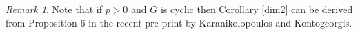 \documentclass[draft, 11pt]{article} %
\theoremstyle{plain}
\theoremstyle{remark}
\newtheorem*{rem}{Remark}
\newcommand{\ZZ}{{\mathbb Z}}
\begin{document}
\begin{rem}
  Note that if $p>0$ and $G$ is cyclic then Corollary \ref{dim2} can be derived from Proposition $6$ in the recent pre-print
 \cite{kako} by Karanikolopoulos and Kontogeorgis.
\end{rem}

\begin{comment}
We also consider an alternative approach to computing the fixed dimension of $H^0(X,\Omega_X^{\otimes m})$, relying on \citep[Thm 4.5]{galoisstruc}.
For the rest of this section we assume that $n$ is co-prime to $p$, that $g_X\geq 2$ and that $g_Y=0$.

We now introduce some notation from \cite{galoisstruc}.
We first denote by $\chi_P$ the representation of the decomposition group $G_P$ on the cotangent space $\mathfrak{m}_P/\mathfrak{m}_P^2$.
We also introduce the unique projective module $N_{G,X}$ satisfying
\begin{equation*}
 \bigoplus^n N_{G,X} = \bigoplus_{P\in X} \bigoplus_{d=1}^{e^t_p-1} \bigoplus^d {\rm Ind}_{G_P}^G(\chi_P^d),
\end{equation*}

where $e^t_p$ denotes the (tame) ramification index at a point $P\in X$, as in \citep[Thm 4.3]{galoisstruc}.

Fix an integer $m\geq 2$. Now if we write $mK_X = \sum_{P\in X} n_P[P]$ then we can define $r_P\in \{0,\ldots, e^t_p - 1\}$ and $s_P\in \ZZ$ to be the unique values such that
\[
 n_P = r_P + s_Pe_P^t.
\]

Finally, if for any $Q\in Y$ we let $\bar Q \in X$ be an element of the fibre with respect to $\pi$, we can state \citep[Thm 4.5]{galoisstruc}, which says that we have the following equality in $K_0(k[G])$:
\begin{equation}\label{eq}
 \chi(G,X,\Omega^{\otimes m}) = -[N_{G,X}] +\sum_{Q\in Y}\sum^{r_{\bar Q}}_{d=1} [{\rm Ind}_{G_{\bar Q}}^G(\chi_{\bar Q}^d)]  + \left( 1 + \sum_{Q\in Y} s_{\bar Q} \right) [k[G]],
\end{equation}
where for any $k[G]$ module $A$ then $[A]$ denotes that class of $A$ in $K_0[k[G]]$.

We wish to find when the action of $G$ on $H^0(X,\Omega^{\otimes m})$ is trivial.
Note that $[H^0(X,\Omega^{\otimes m})]$ is in the same class as $\chi(G,X,\Omega^{\otimes m})$ in $K_0(k[G])$, since $mK_X$ is non-special under our assumptions.
Hence the action will be trivial precisely when we have equality between the dimension and the fixed dimension.
We will work out the dimension and fixed dimension of each of the components of the above sum separately, before combining them to give a complete answer.



\end{comment}
\end{document}

